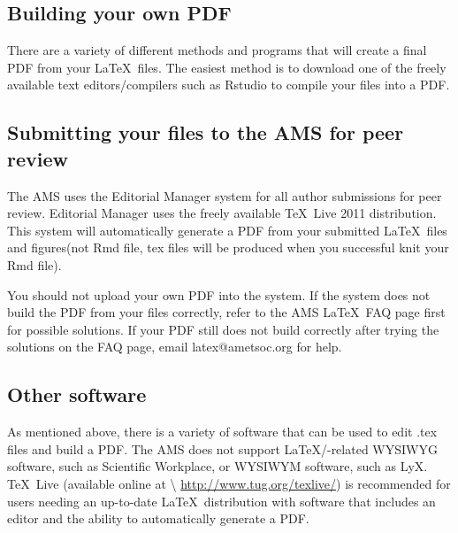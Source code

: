 \documentclass[draft]{ametsoc}
\begin{document}
\appendix[C]

\hypertarget{building-your-own-pdf}{%
\subsection{Building your own PDF}\label{building-your-own-pdf}}

There are a variety of different methods and programs that will create a
final PDF from your \LaTeX~files. The easiest method is to download one
of the freely available text editors/compilers such as Rstudio to
compile your files into a PDF.

\hypertarget{submitting-your-files-to-the-ams-for-peer-review}{%
\subsection{Submitting your files to the AMS for peer
review}\label{submitting-your-files-to-the-ams-for-peer-review}}

The AMS uses the Editorial Manager system for all author submissions for
peer review. Editorial Manager uses the freely available \TeX~Live 2011
distribution. This system will automatically generate a PDF from your
submitted \LaTeX~files and figures(not Rmd file, tex files will be
produced when you successful knit your Rmd file).

You should not upload your own PDF into the system. If the system does
not build the PDF from your files correctly, refer to the AMS \LaTeX~FAQ
page first for possible solutions. If your PDF still does not build
correctly after trying the solutions on the FAQ page, email
latex@ametsoc.org for help.

\hypertarget{other-software}{%
\subsection{Other software}\label{other-software}}

As mentioned above, there is a variety of software that can be used to
edit .tex files and build a PDF. The AMS does not support
\LaTeX/-related WYSIWYG software, such as Scientific Workplace, or
WYSIWYM software, such as LyX. \TeX~Live (available online at
\textbackslash{} \url{http://www.tug.org/texlive/}) is recommended for
users needing an up-to-date \LaTeX~distribution with software that
includes an editor and the ability to automatically generate a PDF.
\end{document}

